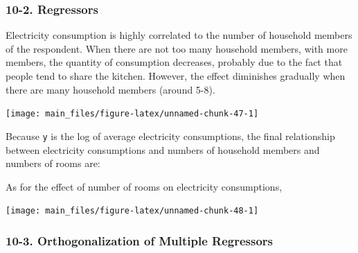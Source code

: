 \documentclass[a4paper]{article}
\newenvironment{Shaded}{\begin{snugshade}}{\end{snugshade}}
\newcommand{\DataTypeTok}[1]{\textcolor[rgb]{0.13,0.29,0.53}{#1}}
\newcommand{\DecValTok}[1]{\textcolor[rgb]{0.00,0.00,0.81}{#1}}
\newcommand{\FloatTok}[1]{\textcolor[rgb]{0.00,0.00,0.81}{#1}}
\newcommand{\KeywordTok}[1]{\textcolor[rgb]{0.13,0.29,0.53}{\textbf{#1}}}
\newcommand{\NormalTok}[1]{#1}
\newcommand{\OperatorTok}[1]{\textcolor[rgb]{0.81,0.36,0.00}{\textbf{#1}}}
\newcommand{\StringTok}[1]{\textcolor[rgb]{0.31,0.60,0.02}{#1}}
\begin{document}
\hypertarget{regressors}{%
\subsubsection{10-2. Regressors}\label{regressors}}

Electricity consumption is highly correlated to the number of household
members of the respondent. When there are not too many household
members, with more members, the quantity of consumption decreases,
probably due to the fact that people tend to share the kitchen. However,
the effect diminishes gradually when there are many household members
(around 5-8).

\begin{center}\texttt{[image: main\_files/figure-latex/unnamed-chunk-47-1]} \end{center}

Because \texttt{y} is the log of average electricity consumptions, the
final relationship between electricity consumptions and numbers of
household members and numbers of rooms are:

As for the effect of number of rooms on electricity consumptions,

\begin{center}\texttt{[image: main\_files/figure-latex/unnamed-chunk-48-1]} \end{center}

\hypertarget{orthogonalization-of-multiple-regressors}{%
\subsubsection{10-3. Orthogonalization of Multiple
Regressors}\label{orthogonalization-of-multiple-regressors}}

\begin{Shaded}
\end{Shaded}
\end{document}
